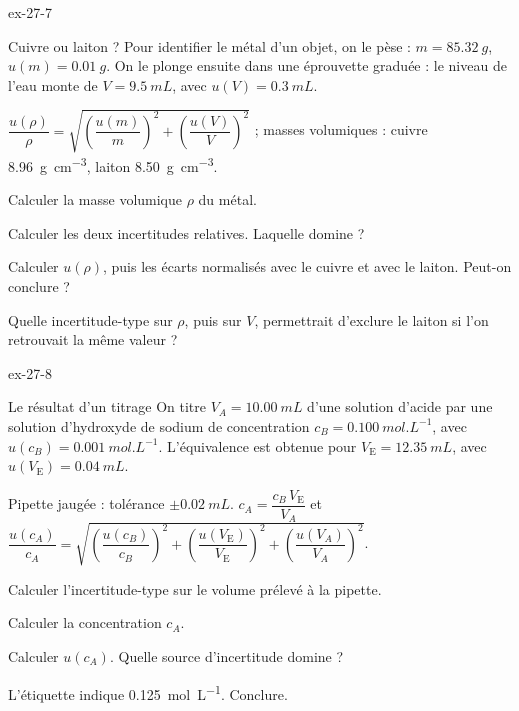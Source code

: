 \begin{blocLivre}{ex-27-7}
\begin{exercice}[2]{Cuivre ou laiton ?}
Pour identifier le métal d'un objet, on le pèse : $m=\qty{85,32}{g}$, $u(m)=\qty{0,01}{g}$. On le plonge ensuite dans une éprouvette
graduée : le niveau de l'eau monte de $V=\qty{9,5}{mL}$, avec $u(V)=\qty{0,3}{mL}$.
\begin{donnees}
$\dfrac{u(\rho)}{\rho}=\sqrt{\left(\dfrac{u(m)}{m}\right)^2+\left(\dfrac{u(V)}{V}\right)^2}$ ; masses volumiques : cuivre \qty{8,96}{g.cm^{-3}}, laiton \qty{8,50}{g.cm^{-3}}.
\end{donnees}
\begin{questions}
\item Calculer la masse volumique $\rho$ du métal.
\item Calculer les deux incertitudes relatives. Laquelle domine ?
\item Calculer $u(\rho)$, puis les écarts normalisés avec le cuivre et avec le laiton. Peut-on conclure ?
\item Quelle incertitude-type sur $\rho$, puis sur $V$, permettrait d'exclure le laiton si l'on retrouvait la même valeur ?
\end{questions}
\end{exercice}
\end{blocLivre}
\begin{blocLivre}{ex-27-8}
\begin{exercice}[2]{Le résultat d'un titrage}
On titre $V_A=\qty{10,00}{mL}$ d'une solution d'acide par une solution d'hydroxyde de sodium de concentration
$c_B=\qty{0,100}{mol.L^{-1}}$, avec $u(c_B)=\qty{0,001}{mol.L^{-1}}$. L'équivalence est obtenue pour $V_\mathrm{E}=\qty{12,35}{mL}$, avec
$u(V_\mathrm{E})=\qty{0,04}{mL}$.
\begin{donnees}
Pipette jaugée : tolérance $\pm\qty{0,02}{mL}$. $c_A=\dfrac{c_B\,V_\mathrm{E}}{V_A}$ et
$\dfrac{u(c_A)}{c_A}=\sqrt{\left(\dfrac{u(c_B)}{c_B}\right)^2+\left(\dfrac{u(V_\mathrm{E})}{V_\mathrm{E}}\right)^2+\left(\dfrac{u(V_A)}{V_A}\right)^2}$.
\end{donnees}
\begin{questions}
\item Calculer l'incertitude-type sur le volume prélevé à la pipette.
\item Calculer la concentration $c_A$.
\item Calculer $u(c_A)$. Quelle source d'incertitude domine ?
\item L'étiquette indique \qty{0,125}{mol.L^{-1}}. Conclure.
\end{questions}
\end{exercice}
\end{blocLivre}
